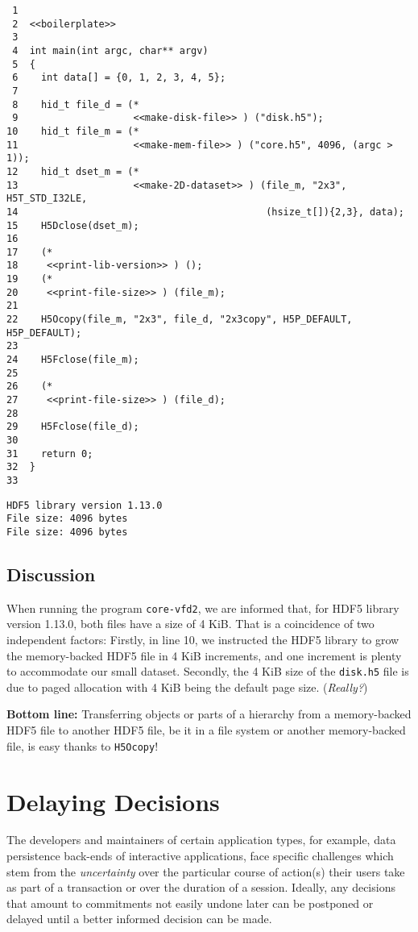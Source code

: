\documentclass[a4paper, 12pt]{article}
\begin{document}
\begin{verbatim}
 1
 2  <<boilerplate>>
 3
 4  int main(int argc, char** argv)
 5  {
 6    int data[] = {0, 1, 2, 3, 4, 5};
 7
 8    hid_t file_d = (*
 9                    <<make-disk-file>> ) ("disk.h5");
10    hid_t file_m = (*
11                    <<make-mem-file>> ) ("core.h5", 4096, (argc > 1));
12    hid_t dset_m = (*
13                    <<make-2D-dataset>> ) (file_m, "2x3", H5T_STD_I32LE,
14                                           (hsize_t[]){2,3}, data);
15    H5Dclose(dset_m);
16
17    (*
18     <<print-lib-version>> ) ();
19    (*
20     <<print-file-size>> ) (file_m);
21
22    H5Ocopy(file_m, "2x3", file_d, "2x3copy", H5P_DEFAULT, H5P_DEFAULT);
23
24    H5Fclose(file_m);
25
26    (*
27     <<print-file-size>> ) (file_d);
28
29    H5Fclose(file_d);
30
31    return 0;
32  }
33
\end{verbatim}

\begin{verbatim}
HDF5 library version 1.13.0
File size: 4096 bytes
File size: 4096 bytes
\end{verbatim}

\subsection{Discussion}
\label{sec:org2f78483}

When running the program \texttt{core-vfd2}, we are informed that, for HDF5 library
version 1.13.0, both files have a size of 4 KiB. That is a coincidence of two
independent factors: Firstly, in line 10, we instructed the HDF5
library to grow the memory-backed HDF5 file in 4 KiB increments, and one
increment is plenty to accommodate our small dataset. Secondly, the 4 KiB size
of the \texttt{disk.h5} file is due to paged allocation with 4 KiB being the default
page size. (\emph{Really?})

\textbf{\textbf{Bottom line:}} Transferring objects or parts of a hierarchy from a
memory-backed HDF5 file to another HDF5 file, be it in a file system or another
memory-backed file, is easy thanks to \texttt{H5Ocopy}!

\section{Delaying Decisions \label{org430fa7f}}
\label{sec:org679a567}

The developers and maintainers of certain application types, for example, data
persistence back-ends of interactive applications, face specific challenges
which stem from the \emph{uncertainty} over the particular course of action(s) their
users take as part of a transaction or over the duration of a session. Ideally,
any decisions that amount to commitments not easily undone later can be
postponed or delayed until a better informed decision can be made.
\end{document}
